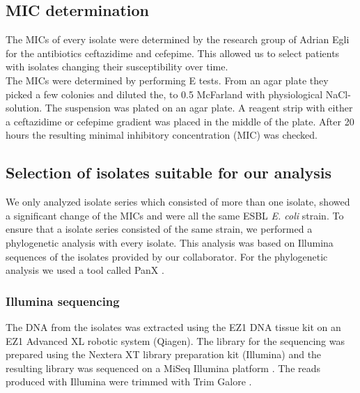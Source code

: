 \subsection{MIC determination}
The MICs of every isolate were determined by the research group of Adrian Egli for the antibiotics ceftazidime and cefepime. This allowed us to select patients with isolates changing their susceptibility over time. \\
The MICs were determined by performing E tests. From an agar plate they picked a few colonies and diluted the, to 0.5 McFarland with physiological NaCl-solution. The suspension was plated on an agar plate. A reagent strip with either a ceftazidime or cefepime gradient was placed in the middle of the plate. After 20 hours the resulting minimal inhibitory concentration (MIC) was checked.

\subsection{Selection of isolates suitable for our analysis}
We only analyzed isolate series which consisted of more than one isolate, showed a significant change of the MICs and were all the same ESBL \textit{E. coli} strain. To ensure that a isolate series consisted of the same strain, we performed a phylogenetic analysis with every isolate. This analysis was based on Illumina sequences of the isolates provided by our collaborator. For the phylogenetic analysis we used a tool called PanX \cite{ding_panx:_2018}.

\subsubsection{Illumina sequencing}
The DNA from the isolates was extracted using the EZ1 DNA tissue kit on an EZ1 Advanced XL robotic system (Qiagen). The library for the sequencing was prepared using the Nextera XT library preparation kit (Illumina) and the resulting library was sequenced on a MiSeq Illumina platform \cite{nanopore}. The reads produced with Illumina were trimmed with Trim Galore \cite{noauthor_babraham_nodate}.
\label{section:illumina}

